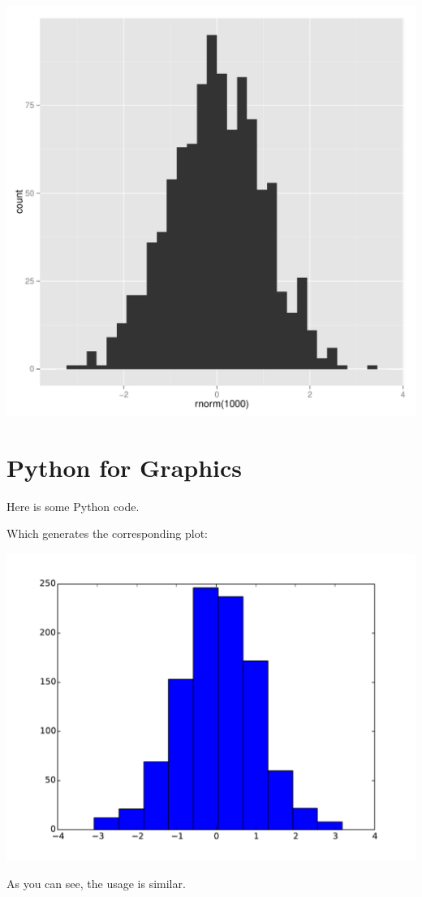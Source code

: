 \documentclass[12pt]{article}
\begin{document}
\centerline{\includegraphics{normal_R.pdf}}

\section{Python for Graphics}

Here is some Python code.



Which generates the corresponding plot:

\centerline{\includegraphics{normal_py.pdf}}

As you can see, the usage is similar.
\end{document}
